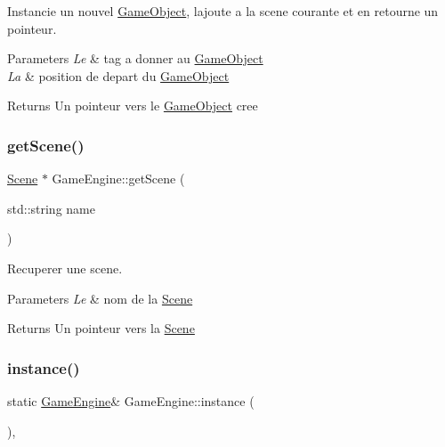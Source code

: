 Instancie un nouvel \hyperlink{class_game_object}{Game\+Object}, l\textquotesingle{}ajoute a la scene courante et en retourne un pointeur. 


\begin{DoxyParams}{Parameters}
{\em Le} & tag a donner au \hyperlink{class_game_object}{Game\+Object} \\
\hline
{\em La} & position de depart du \hyperlink{class_game_object}{Game\+Object} \\
\hline
\end{DoxyParams}
\begin{DoxyReturn}{Returns}
Un pointeur vers le \hyperlink{class_game_object}{Game\+Object} cree 
\end{DoxyReturn}
\hypertarget{class_game_engine_ac70d59f0de33c34f84863a550408a476}{}\label{class_game_engine_ac70d59f0de33c34f84863a550408a476} 
\subsubsection{\texorpdfstring{get\+Scene()}{getScene()}}
{\footnotesize\ttfamily \hyperlink{class_scene}{Scene} $\ast$ Game\+Engine\+::get\+Scene (\begin{DoxyParamCaption}\item[{std\+::string}]{name }\end{DoxyParamCaption})}



Recuperer une scene. 


\begin{DoxyParams}{Parameters}
{\em Le} & nom de la \hyperlink{class_scene}{Scene} \\
\hline
\end{DoxyParams}
\begin{DoxyReturn}{Returns}
Un pointeur vers la \hyperlink{class_scene}{Scene} 
\end{DoxyReturn}
\hypertarget{class_game_engine_a5d5df5f1dabaaa1b98eeb1340f4f118d}{}\label{class_game_engine_a5d5df5f1dabaaa1b98eeb1340f4f118d} 
\subsubsection{\texorpdfstring{instance()}{instance()}}
{\footnotesize\ttfamily static \hyperlink{class_game_engine}{Game\+Engine}\& Game\+Engine\+::instance (\begin{DoxyParamCaption}{ }\end{DoxyParamCaption})\hspace{0.3cm}{\ttfamily [inline]}, {\ttfamily [static]}}



